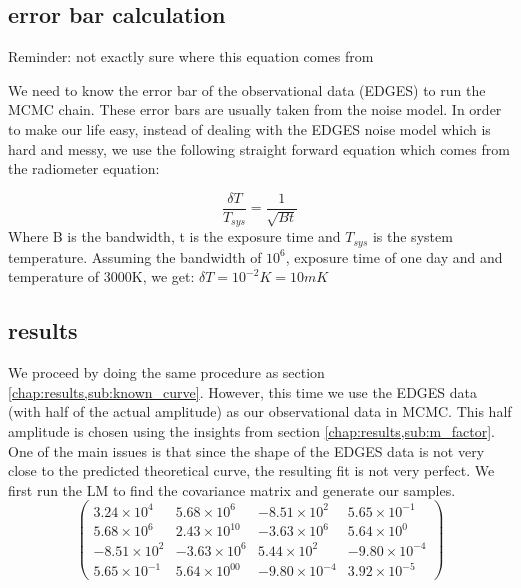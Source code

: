 \documentclass[12pt, TexShade, letterpaper]{report}
\begin{document}
\subsection{error bar calculation}
Reminder: not exactly sure where this equation comes from\par

We need to know the error bar of the observational data (EDGES) to run the MCMC chain. These error bars are usually taken from the noise model. In order to make our life easy, instead of dealing with the EDGES noise model which is hard and messy, we use the following straight forward equation which comes from the radiometer equation:\par
\begin{equation}
    \frac{\delta T}{T_{sys}} = \frac{1}{\sqrt{Bt}}
\end{equation}
Where B is the bandwidth, t is the exposure time and $T_{sys}$ is the system temperature. Assuming the bandwidth of $10^6$, exposure time of one day and and temperature of 3000K, we get:
$\delta T = 10 ^{-2}K = 10mK$
\subsection{results}
We proceed by doing the same procedure as section \ref{chap:results,sub:known_curve}. However, this time we use the EDGES data (with half of the actual amplitude) as our observational data in MCMC. This half amplitude is chosen using the insights from section \ref{chap:results,sub:m_factor}. One of the main issues is that since the shape of the EDGES data is not very close to the predicted theoretical curve, the resulting fit is not very perfect. We first run the LM to find the covariance matrix and generate our samples. 
\begin{equation}
\label{eq:cov_mat_edges}
    \begin{pmatrix}
    3.24\times 10^{4} & 5.68 \times 10^{6} &  -8.51 \times 10^{2} &  5.65 \times 10^{-1} \\
    5.68 \times 10^{6} &  2.43 \times 10^{10} &  -3.63 \times 10^{6} &  5.64 \times 10^{0} \\
    -8.51 \times 10^{2} &  -3.63 \times 10^{6} &  5.44 \times 10^{2} &  -9.80 \times 10^{-4} \\
    5.65 \times 10^{-1} &  5.64\times 10^{00} &  -9.80\times 10^{-4} &  3.92 \times 10^{-5} 
    \end{pmatrix}
\end{equation}
\end{document}
